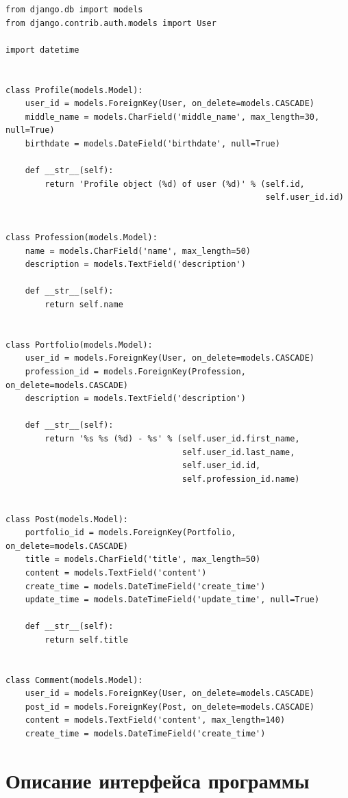 \begin{lstlisting}[caption={Модели Django}, label=lst:models]
from django.db import models
from django.contrib.auth.models import User

import datetime


class Profile(models.Model):
    user_id = models.ForeignKey(User, on_delete=models.CASCADE)
    middle_name = models.CharField('middle_name', max_length=30, null=True)
    birthdate = models.DateField('birthdate', null=True)

    def __str__(self):
        return 'Profile object (%d) of user (%d)' % (self.id,
                                                     self.user_id.id)


class Profession(models.Model):
    name = models.CharField('name', max_length=50)
    description = models.TextField('description')

    def __str__(self):
        return self.name


class Portfolio(models.Model):
    user_id = models.ForeignKey(User, on_delete=models.CASCADE)
    profession_id = models.ForeignKey(Profession, on_delete=models.CASCADE)
    description = models.TextField('description')

    def __str__(self):
        return '%s %s (%d) - %s' % (self.user_id.first_name,
                                    self.user_id.last_name,
                                    self.user_id.id,
                                    self.profession_id.name)


class Post(models.Model):
    portfolio_id = models.ForeignKey(Portfolio, on_delete=models.CASCADE)
    title = models.CharField('title', max_length=50)
    content = models.TextField('content')
    create_time = models.DateTimeField('create_time')
    update_time = models.DateTimeField('update_time', null=True)

    def __str__(self):
        return self.title


class Comment(models.Model):
    user_id = models.ForeignKey(User, on_delete=models.CASCADE)
    post_id = models.ForeignKey(Post, on_delete=models.CASCADE)
    content = models.TextField('content', max_length=140)
    create_time = models.DateTimeField('create_time')
\end{lstlisting}

\section{Описание интерфейса программы}%
\label{sec:opisanie_interfeisa_programmy}

